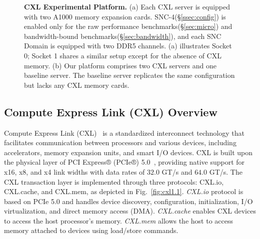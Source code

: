 \begin{figure}[t]
    \centering
    \caption{\textbf{CXL Experimental Platform.} (a) Each CXL server is equipped with two A1000 memory expansion cards. SNC-4(\S\ref{ssec:config}) is enabled only for the raw performance benchmarks(\S\ref{sec:micro}) and bandwidth-bound benchmarks(\S\ref{sec:bandwidth}), and each SNC Domain is equipped with two DDR5 channels. (a) illustrates Socket 0; Socket 1 shares a similar setup except for the absence of CXL memory. (b) Our platform comprises two CXL servers and one baseline server. The baseline server replicates the same configuration but lacks any CXL memory cards.}
\end{figure}

\subsection{Compute Express Link (CXL) Overview}

Compute Express Link (CXL)~\cite{sharma2022compute} is a standardized interconnect technology that facilitates communication between processors and various devices, including accelerators, memory expansion units, and smart I/O devices. CXL is built upon the physical layer of PCI Express® (PCIe®) 5.0~\cite{pcie5.0}, providing native support for x16, x8, and x4 link widths with data rates of $32.0$ GT/s and $64.0$ GT/s. The CXL transaction layer is implemented through three protocols: CXL.io, CXL.cache, and CXL.mem, as depicted in Fig.~\ref{fig:cxl1.1}. \textit{CXL.io} protocol is based on PCIe 5.0 and handles device discovery, configuration, initialization, I/O virtualization, and direct memory access (DMA). \textit{CXL.cache} enables CXL devices to access the host processor's memory. \textit{CXL.mem} allows the host to access memory attached to devices using load/store commands.

